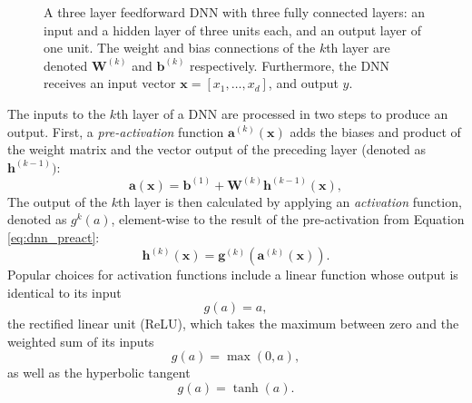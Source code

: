 \begin{figure}[htb!]
    \centering
    
    \caption[A feedforward neural network]{
    A three layer feedforward DNN with three fully connected layers: an input and a hidden layer of three units each, and an output layer of one unit. 
    The weight and bias connections of the $k$th layer are denoted $\mathbf{W}^{(k)}$ and $\mathbf{b}^{(k)}$ respectively.
    Furthermore, the DNN receives an input vector $\bm{x}=[x_1, \ldots ,x_d]$, and output $\hat{y}$.}
    \label{fig:neural_network}
\end{figure}




The inputs to the $k$th layer of a DNN are processed in two steps to produce an output. First, a \emph{pre-activation} function $\bm{a}^{(k)}(\bm{x})$ 
adds the biases and product of the weight matrix and the vector output of the preceding layer (denoted as $\mathbf{h}^{(k-1)})$:
\begin{equation}\label{eq:dnn_preact}
    \bm{a}(\bm{x}) = \mathbf{b}^{(1)} + \mathbf{W}^{(k)} \mathbf{h}^{(k-1)}(\bm{x}),
\end{equation}
The output of the $k$th layer is then calculated by applying an \emph{activation} function, denoted as $g^{k}(a)$, element-wise to the result of the pre-activation from Equation \ref{eq:dnn_preact}:
\begin{equation}\label{eq:dnn_act}
    \mathbf{h}^{(k)}(\bm{x}) = \bm{g}^{(k)}( \bm{a}^{(k)} (\bm{x}) ).
\end{equation}
Popular choices for activation functions include a linear function whose output is identical to its input
\begin{equation}
    g(a) = a,
    \label{eq:linear_act}
\end{equation}
the rectified linear unit (ReLU), which takes the maximum between zero and the weighted sum of its inputs
\begin{equation}
    g(a) = \max(0,a),
    \label{eq:ReLU_act}
\end{equation}
as well as the hyperbolic tangent
\begin{equation}
    g(a) = \tanh(a).
    \label{eq:tanh_act}
\end{equation}


